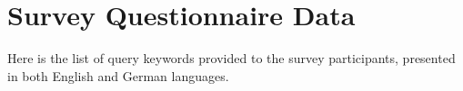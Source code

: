 \begin{description}
	

	

	

	
	

	

	
	

	

	
	

	

	

	

	

	

	

	

	

	

	

	

	

	


	

	
	
\end{description}



\chapter{Survey Questionnaire Data}
\label{appendix:B}
Here is the list of query keywords provided to the survey participants, presented in both English and German languages.

